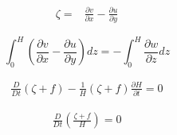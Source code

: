 \documentclass[12pt,a4paper]{article}
\begin{document}
\begin{align*}
\zeta=&\frac{\partial v}{\partial x}-\frac{\partial u}{\partial y}
\end{align*}

\begin{equation*}
   \int_0^H \left( \frac{\partial v}{\partial x}-\frac{\partial u}{\partial y} \right) dz = - \int_0^H \frac{\partial w}{\partial z} dz
\end{equation*}

\begin{align*}
       \frac{D}{Dt}(\zeta+f)-\frac{1}{H}(\zeta+f)\frac{\partial H}{\partial t}=0
\end{align*}

\begin{align*}
       \frac{D}{Dt} \left( \frac{\zeta+f}{H} \right) = 0
\end{align*}
\end{document}
